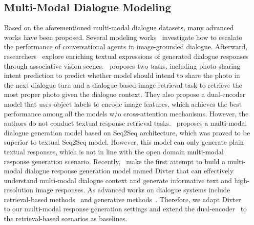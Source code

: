 \documentclass[11pt]{article}
\begin{document}
 

\subsection{Multi-Modal Dialogue Modeling}

Based on the aforementioned multi-modal dialogue datasets, many advanced works have been proposed. Several modeling works~\citep{qi2020two,niu2019recursive,gan2019multi} investigate how to escalate the performance of conversational agents in image-grounded dialogue. Afterward, researchers~\citep{yang2021open,liang2021maria} explore enriching textual expressions of generated dialogue responses through associative vision scenes.~\citet{zang-etal-2021-photochat} proposes two tasks, including photo-sharing intent prediction to predict whether model should intend to share the photo in the next dialogue turn and a dialogue-based image retrieval task to retrieve the most proper photo given the dialogue context. They also propose a dual-encoder model that uses object labels to encode image features, which achieves the best performance among all the models w/o cross-attention mechanisms. However, the authors do not conduct textual response retrieval tasks.~\citet{zheng-etal-2022-mmchat} proposes a multi-modal dialogue generation model based on Seq2Seq architecture, which was proved to be superior to textual Seq2Seq model. However, this model can only generate plain textual responses, which is not in line with the open domain multi-modal response generation scenario. Recently,~\citet{sun-etal-2022-multimodal} make the first attempt to build a multi-modal dialogue response generation model named Divter that can effectively understand multi-modal dialogue context and generate informative text and high-resolution image responses. As advanced works on dialogue systems include retrieval-based methods~\citep{wu2017sequential,zhou2018multi,whang2020effective,li2021small} and generative methods~\citep{li2015diversity,serban2016building,zhang2020dialogpt}. Therefore, we adapt Divter~\cite{sun-etal-2022-multimodal} to our multi-modal response generation settings and extend the dual-encoder~\cite{zang-etal-2021-photochat} to the retrieval-based scenarios as baselines.





%
\end{document}
